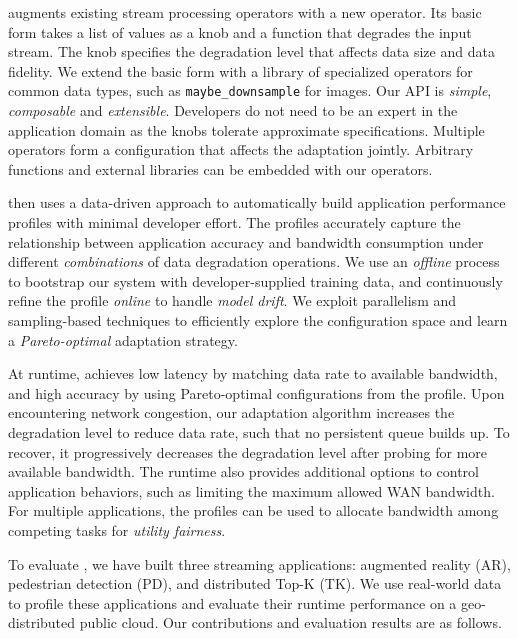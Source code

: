 \sysname{} augments existing stream processing operators with a new \maybe{}
operator. Its basic form takes a list of values as a knob and a function that
degrades the input stream. The knob specifies the degradation level that affects
data size and data fidelity. We extend the basic form with a library of
specialized operators for common data types, such as \texttt{maybe\_downsample}
for images. Our API is \textit{simple}, \textit{composable} and
\textit{extensible}. Developers do not need to be an expert in the application
domain as the knobs tolerate approximate specifications. Multiple operators form
a configuration that affects the adaptation jointly. Arbitrary functions and
external libraries can be embedded with our operators.

\sysname{} then uses a data-driven approach to automatically build application
performance profiles with minimal developer effort. The profiles accurately
capture the relationship between application accuracy and bandwidth consumption
under different \textit{combinations} of data degradation operations. We use an
\textit{offline} process to bootstrap our system with developer-supplied
training data, and continuously refine the profile \textit{online} to handle
\textit{model drift}. We exploit parallelism and sampling-based techniques to
efficiently explore the configuration space and learn a \textit{Pareto-optimal}
adaptation strategy.

At runtime, \sysname{} achieves low latency by matching data rate to available
bandwidth, and high accuracy by using Pareto-optimal configurations from the
profile. Upon encountering network congestion, our adaptation algorithm
increases the degradation level to reduce data rate, such that no persistent
queue builds up. To recover, it progressively decreases the degradation level
after probing for more available bandwidth. The runtime also provides additional
options to control application behaviors, such as limiting the maximum allowed
WAN bandwidth. For multiple applications, the profiles can be used to allocate
bandwidth among competing tasks for \textit{utility fairness}.

To evaluate \sysname{}, we have built three streaming applications: augmented
reality (AR), pedestrian detection (PD), and distributed Top-K (TK). We use
real-world data to profile these applications and evaluate their runtime
performance on a geo-distributed public cloud. Our contributions and evaluation
results are as follows.

